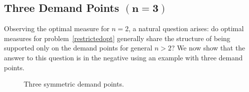 \documentclass[stsy,sglanonrev]{informs4}
\begin{document}
\subsection{Three Demand Points \texorpdfstring{$\mathbf{(n=3)}$}{(n=3)}}\label{sec:casen=3}
Observing the optimal measure for \(n=2\), a natural question arises: do optimal measures for problem~\eqref{restrictedopt} generally share the structure of being supported only on the demand points for general \(n > 2\)? We now show that the answer to this question is in the negative using an example with three demand points.

\begin{figure}[htbp]
    \centering
    \caption{Three symmetric demand points.}
    \label{fig:demandpts3}
\end{figure}
\end{document}
